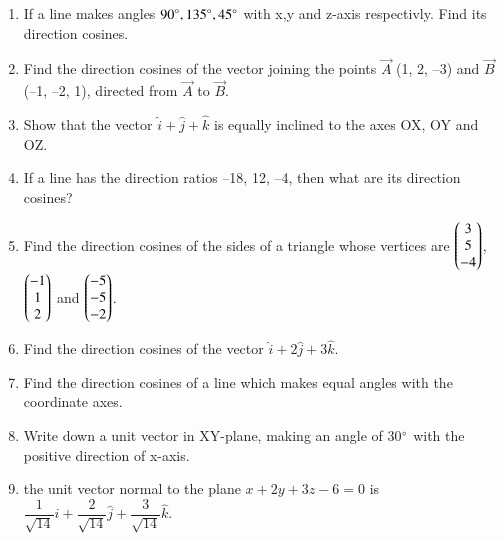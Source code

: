 \begin{enumerate}[label=\thesubsection.\arabic*,ref=\thesubsection.\theenumi]
\\
\solution
		
	\item If a line makes angles $90\degree,135\degree,45\degree$ with x,y and z-axis respectivly. Find its direction cosines.
		\\
		\solution
		
\item Find the direction cosines of the vector joining the points $\vec{A}$ (1, 2, –3) and
$\vec{B}$(–1, –2, 1), directed from $\vec{A}$ to $\vec{B}$.
	\\
    \solution 
		
\item Show that the vector $\hat{i}+\hat{j}+\hat{k}$ is equally inclined to the axes OX, OY and OZ.
	\\
\solution
		
\item If a line has the direction ratios –18, 12, –4, then what are its direction cosines?
		\\
		\solution
		
	\item Find the direction cosines of the sides of a triangle whose vertices are $\begin{pmatrix}3\\ 5\\-4 \end{pmatrix}$, $\begin{pmatrix} -1\\1 \\2 \end{pmatrix}$ and $\begin{pmatrix}-5 \\-5 \\-2 \end{pmatrix}$.
		\\
		\solution
		
\item Find the direction cosines of the vector $\hat{i}+2\hat{j}+3\hat{k}$.
	\\
    \solution 
		
    \item Find the direction cosines of a line which makes equal angles with the coordinate
    axes.
		\\
		\solution
		
\item Write down a unit vector in XY-plane, making an angle of 30$\degree$ with the positive direction of x-axis.\\
\item the unit vector normal to the plane $x+2y+3z-6=0$ is $\dfrac{1}{\sqrt{14}}\hat{i} + \dfrac{2}{\sqrt{14}}\hat{j} + \dfrac{3}{\sqrt{14}}\hat{k}$.
\end{enumerate}
